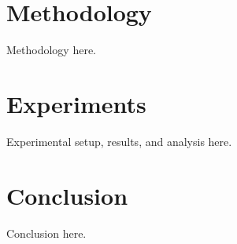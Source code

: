 \documentclass{article} %
\begin{document}
\section{Methodology}
\label{sec:method}
Methodology here.

\section{Experiments}
\label{sec:experiments}
Experimental setup, results, and analysis here.

\section{Conclusion}
\label{sec:conclusion}
Conclusion here.




\end{document}
